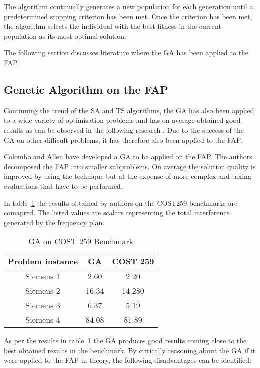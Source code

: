 The algorithm continually generates a new population for each generation until a predetermined stopping criterion has been met. Once the criterion has been met, the algorithm selects the individual with the best fitness in the current population as its most optimal solution.

The following section discusses literature where the GA has been applied to the FAP.

\subsection{Genetic Algorithm on the FAP}
Continuing the trend of the SA and TS algorithms, the GA has also been applied to a wide variety of optimisation problems and has on average obtained good results as can be observed in the following research \cite{GANonConvex,SelfAdaptiveDataMiningGA,AutoComplexMeta}. Due to the success of the GA on other difficult problems, it has therefore also been applied to the FAP.

Colombo and Allen\cite{ProblemDecompMIFAP} have developed a GA to be applied on the FAP. The authors decomposed the FAP into smaller subproblems. On average the solution quality is improved by using the technique but at the expense of more complex and taxing evaluations that have to be performed\cite{ProblemDecompMIFAP}. 

In table~\ref{tab:GA} the results obtained by authors on the COST259 benchmarks are comapred. The listed values are scalars representing the total interference generated by the frequency plan.
\begin{table}[H]
\centering
	\begin{tabular}{| c | c | c |}
	\hline
	Problem instance & GA & COST 259 \\ \hline
	Siemens 1 & 2.60 & 2.20 \\ \hline
	Siemens 2 & 16.34 & 14.280 \\ \hline
	Siemens 3 & 6.37 & 5.19 \\ \hline
	Siemens 4 & 84.08 & 81.89 \\ \hline
	\end{tabular}
\caption{GA on COST 259 Benchmark}
\label{tab:GA}
\end{table}

As per the results in table~\ref{tab:GA} the GA produces good results coming close to the best obtained results in the benchmark. By critically reasoning about the GA if it were applied to the FAP in theory, the following disadvantages can be identified:

